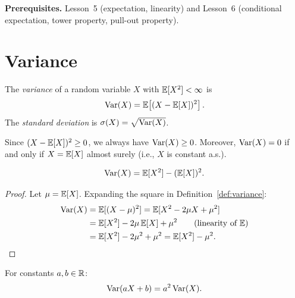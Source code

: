 \documentclass[11pt,a4paper]{article}
\begin{document}
\medskip
\noindent\textbf{Prerequisites.}
Lesson~5 (expectation, linearity) and Lesson~6 (conditional
expectation, tower property, pull-out property).


\section{Variance}
\label{sec:variance}

\begin{definition}[Variance]
\label{def:variance}
The \emph{variance} of a random variable $X$ with
$\mathbb{E}[X^2] < \infty$ is
\begin{equation}
  \operatorname{Var}(X) = \mathbb{E}\!\left[(X - \mathbb{E}[X])^2\right].
  \label{eq:var_def}
\end{equation}
The \emph{standard deviation} is
$\sigma(X) = \sqrt{\operatorname{Var}(X)}$.
\end{definition}

\begin{remark}
Since $(X - \mathbb{E}[X])^2 \geq 0$, we always have $\operatorname{Var}(X) \geq 0$.
Moreover, $\operatorname{Var}(X) = 0$ if and only if $X = \mathbb{E}[X]$ almost
surely (i.e., $X$ is constant a.s.).
\end{remark}

\begin{keyresult}[title={Computational Formula for Variance}]
\begin{theorem}
\label{thm:var_formula}
\begin{equation}
  \operatorname{Var}(X) = \mathbb{E}[X^2] - (\mathbb{E}[X])^2.
  \label{eq:var_formula}
\end{equation}
\end{theorem}
\end{keyresult}

\begin{proof}
Let $\mu = \mathbb{E}[X]$.  Expanding the square in
Definition~\ref{def:variance}:
\begin{align}
  \Var(X) &= \E[(X - \mu)^2]
  = \E[X^2 - 2\mu X + \mu^2]
  \nonumber\\
  &= \E[X^2] - 2\mu\,\E[X] + \mu^2
  \tag{linearity of $\E$}\\
  &= \E[X^2] - 2\mu^2 + \mu^2
  = \E[X^2] - \mu^2.
  \label{eq:var_formula_proof}
\end{align}
\end{proof}

\begin{proposition}
\label{prop:var_scaling}
For constants $a, b \in \mathbb{R}$:
\begin{equation}
  \operatorname{Var}(aX + b) = a^2 \operatorname{Var}(X).
  \label{eq:var_scaling}
\end{equation}
\end{proposition}
\end{document}
